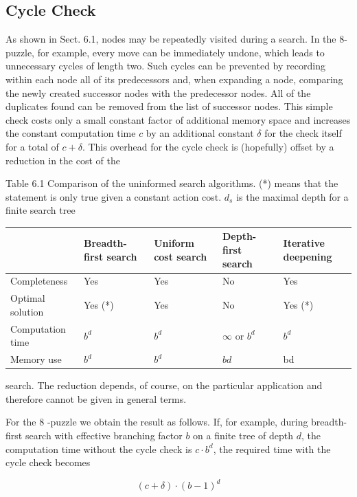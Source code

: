 \documentclass[10pt]{book}
\begin{document}
\subsection{Cycle Check}
As shown in Sect. 6.1, nodes may be repeatedly visited during a search. In the 8-puzzle, for example, every move can be immediately undone, which leads to unnecessary cycles of length two. Such cycles can be prevented by recording within each node all of its predecessors and, when expanding a node, comparing the newly created successor nodes with the predecessor nodes. All of the duplicates found can be removed from the list of successor nodes. This simple check costs only a small constant factor of additional memory space and increases the constant computation time $c$ by an additional constant $\delta$ for the check itself for a total of $c+\delta$. This overhead for the cycle check is (hopefully) offset by a reduction in the cost of the

Table 6.1 Comparison of the uninformed search algorithms. (*) means that the statement is only true given a constant action cost. $d_{s}$ is the maximal depth for a finite search tree

\begin{center}
\begin{tabular}{|l|l|l|l|l|}
\hline
 & Breadth-first search & Uniform cost search & Depth-first search & Iterative deepening \\
\hline
Completeness & Yes & Yes & No & Yes \\
\hline
Optimal solution & Yes (*) & Yes & No & Yes (*) \\
\hline
Computation time & $b^{d}$ & $b^{d}$ & $\infty$ or $b^{d}$ & $b^{d}$ \\
\hline
Memory use & $b^{d}$ & $b^{d}$ & $b d$ & bd \\
\hline
\end{tabular}
\end{center}

search. The reduction depends, of course, on the particular application and therefore cannot be given in general terms.


For the 8 -puzzle we obtain the result as follows. If, for example, during breadth-first search with effective branching factor $b$ on a finite tree of depth $d$, the computation time without the cycle check is $c \cdot b^{d}$, the required time with the cycle check becomes

$$
(c+\delta) \cdot(b-1)^{d}
$$
\end{document}
